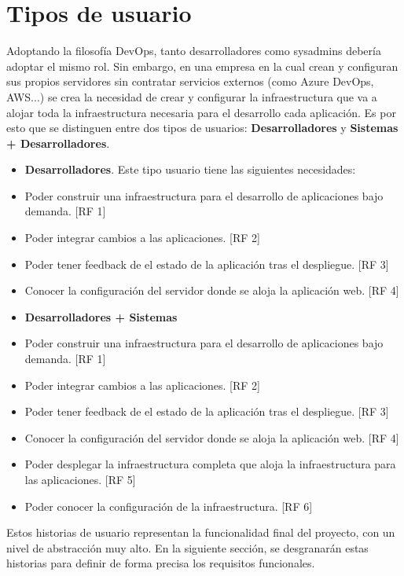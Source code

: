 \section{Tipos de usuario}
	\begin{paragraph}
		Adoptando la filosofía DevOps, tanto desarrolladores como sysadmins debería adoptar el mismo rol. Sin embargo, en una empresa en la cual crean y configuran sus propios servidores sin contratar servicios externos (como Azure DevOps, AWS...) se crea la necesidad de crear y configurar la infraestructura que va a alojar toda la infraestructura necesaria para el desarrollo cada aplicación. Es por esto que se distinguen entre dos tipos de usuarios: \textbf{Desarrolladores} y \textbf{Sistemas + Desarrolladores}.  
		
		\begin{itemize}
			\item \textbf{Desarrolladores}. Este tipo usuario tiene las siguientes necesidades:
				\item Poder construir una infraestructura para el desarrollo de aplicaciones bajo demanda. [RF 1]
				\item Poder integrar cambios a las aplicaciones. [RF 2]
				\item Poder tener feedback de el estado de la aplicación tras el despliegue. [RF 3]
				\item Conocer la configuración del servidor donde se aloja la aplicación web. [RF 4]
			\item \textbf{Desarrolladores + Sistemas}
				\item Poder construir una infraestructura para el desarrollo de aplicaciones bajo demanda. [RF 1]
				\item Poder integrar cambios a las aplicaciones. [RF 2]
				\item Poder tener feedback de el estado de la aplicación tras el despliegue. [RF 3]
				\item Conocer la configuración del servidor donde se aloja la aplicación web. [RF 4]
				\item Poder desplegar la infraestructura completa que aloja la infraestructura para las aplicaciones. [RF 5]
				\item Poder conocer la configuración de la infraestructura. [RF 6]
		\end{itemize}
	
		Estos historias de usuario representan la funcionalidad final del proyecto, con un nivel de abstracción muy alto. En la siguiente sección, se desgranarán estas historias para definir de forma precisa los requisitos funcionales. \cite{ReqF:online} 
	\end{paragraph}

